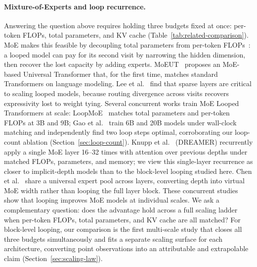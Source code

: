 \documentclass[]{bytedance_seed}
\theoremstyle{definition}
\theoremstyle{remark}
\begin{document}
\paragraph{Mixture-of-Experts and loop recurrence.}
Answering the question above requires holding three budgets fixed at once: per-token FLOPs, total parameters, and KV cache (Table~\ref{tab:related-comparison}).
%
MoE makes this feasible by decoupling total parameters from per-token FLOPs~\cite{shazeer2017outrageously,fedus2022switch}: a looped model can pay for its second visit by narrowing the hidden dimension, then recover the lost capacity by adding experts.
%
MoEUT~\cite{csordas2024moeut} proposes an MoE-based Universal Transformer that, for the first time, matches standard Transformers on language modeling.
%
Lee et al.~\cite{lee2026sparse} find that sparse layers are critical to scaling looped models, because routing divergence across visits recovers expressivity lost to weight tying.
%
Several concurrent works train MoE Looped Transformers at scale: LoopMoE~\cite{chen2026loopmoe} matches total parameters and per-token FLOPs at 3B and 9B; Gao et al.~\cite{gao2026loopie} train 6B and 20B models under wall-clock matching and independently find two loop steps optimal, corroborating our loop-count ablation (Section~\ref{sec:loop-count}).
%
Knupp et al.~\cite{knupp2026dreamer} (DREAMER) recurrently apply a single MoE layer 16--32 times with attention over previous depths under matched FLOPs, parameters, and memory; we view this single-layer recurrence as closer to implicit-depth models than to the block-level looping studied here.
%
Chen et al.~\cite{chen2026moue} share a universal expert pool across layers, converting depth into virtual MoE width rather than looping the full layer block.
%
These concurrent studies show that looping improves MoE models at individual scales.
%
We ask a complementary question: does the advantage hold across a full scaling ladder when per-token FLOPs, total parameters, and KV cache are all matched?
%
For block-level looping, our comparison is the first multi-scale study that closes all three budgets simultaneously and fits a separate scaling surface for each architecture, converting point observations into an attributable and extrapolable claim (Section~\ref{sec:scaling-law}).
%
\end{document}
